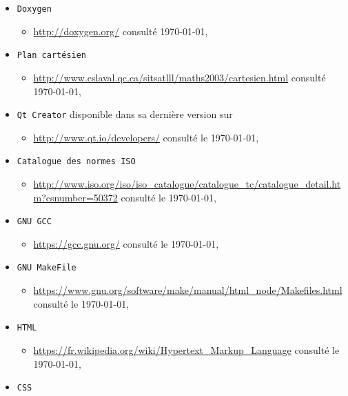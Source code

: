 \documentclass[a4paper,11pt]{report}
\begin{document}
\begin{itemize}
	\item[] \texttt{Doxygen} 
		\begin{itemize}
			\item \url{http://doxygen.org/} consulté \today,\\
		\end{itemize}
	\item[] \texttt{Plan cartésien} 
		\begin{itemize}
			\item \url{http://www.cslaval.qc.ca/sitsatlll/maths2003/cartesien.html} consulté \today,\\
		\end{itemize}
	\item[] \texttt{Qt Creator} disponible dans sa dernière version sur 
		\begin{itemize}
			\item \url{http://www.qt.io/developers/} consulté le \today,\\
		\end{itemize}
	\item[] \texttt{Catalogue des normes ISO} 
		\begin{itemize}
			\item \url{http://www.iso.org/iso/iso_catalogue/catalogue_tc/catalogue_detail.htm?csnumber=50372}
				consulté le \today,\\
		\end{itemize}
	\item[] \texttt{GNU GCC} 
		\begin{itemize}
			\item \url{https://gcc.gnu.org/} consulté le \today,\\
		\end{itemize}
	\item[] \texttt{GNU MakeFile} 
		\begin{itemize}
			\item \url{https://www.gnu.org/software/make/manual/html_node/Makefiles.html} consulté le \today, \\
		\end{itemize}
	\item[] \texttt{HTML} 
		\begin{itemize}
			\item \url{https://fr.wikipedia.org/wiki/Hypertext_Markup_Language} consulté le \today,\\
		\end{itemize}
	\item[] \texttt{CSS} 
		\begin{itemize}

\end{itemize}
\end{itemize}
\end{document}

